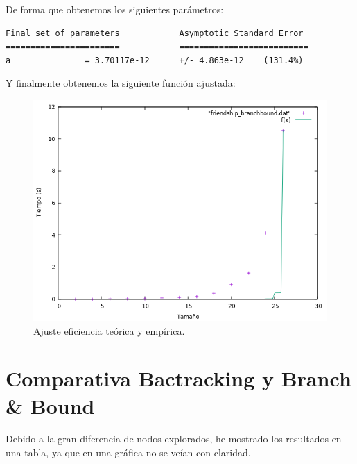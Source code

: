 De forma que obtenemos los siguientes parámetros:

\begin{shaded*}
\begin{verbatim}
Final set of parameters            Asymptotic Standard Error
=======================            ==========================
a               = 3.70117e-12      +/- 4.863e-12    (131.4%)
\end{verbatim}
\end{shaded*}

Y finalmente obtenemos la siguiente función ajustada:
\begin{figure}[H]
    \begin{center}
        \includegraphics[scale=0.7]{imagenes/bbadj.png}
        \caption{Ajuste eficiencia teórica y empírica.}
        \label{fig3}
    \end{center}
\end{figure}

\section{Comparativa Bactracking y Branch \& Bound }

Debido a la gran diferencia de nodos explorados, he mostrado los resultados en una tabla, ya que en una gráfica no se veían con claridad.

